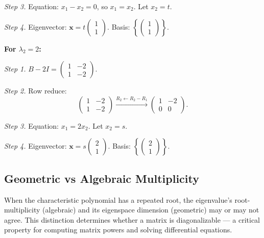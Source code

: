 \documentclass[12pt,a4paper]{article}
\begin{document}
\textit{Step 3.} Equation: $x_1 - x_2 = 0$, so $x_1 = x_2$. Let $x_2 = t$.

\textit{Step 4.} Eigenvector: $\mathbf{x} = t\begin{pmatrix} 1 \\ 1 \end{pmatrix}$. Basis: $\left\{\begin{pmatrix}1\\1\end{pmatrix}\right\}$.

\textbf{For $\lambda_2 = 2$:}

\textit{Step 1.} $B - 2I = \begin{pmatrix} 1 & -2 \\ 1 & -2 \end{pmatrix}$.

\textit{Step 2.} Row reduce:
\[
  \begin{pmatrix} 1 & -2 \\ 1 & -2 \end{pmatrix}
  \xrightarrow{R_2 \leftarrow R_2 - R_1}
  \begin{pmatrix} 1 & -2 \\ 0 & 0 \end{pmatrix}.
\]

\textit{Step 3.} Equation: $x_1 = 2x_2$. Let $x_2 = s$.

\textit{Step 4.} Eigenvector: $\mathbf{x} = s\begin{pmatrix} 2 \\ 1 \end{pmatrix}$. Basis: $\left\{\begin{pmatrix}2\\1\end{pmatrix}\right\}$.

\subsection{Geometric vs Algebraic Multiplicity}

When the characteristic polynomial has a repeated root, the eigenvalue's root-multiplicity (algebraic)
and its eigenspace dimension (geometric) may or may not agree.
This distinction determines whether a matrix is diagonalizable --- a critical property for
computing matrix powers and solving differential equations.
\end{document}
